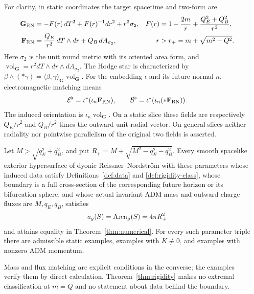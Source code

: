 For clarity, in static coordinates the target spacetime and two-form are
\begin{align}
 \mathbf G_{\rm RN}&=-F(r)\,dT^2+F(r)^{-1}dr^2+r^2\sigma_2,
 &F(r)&=1-\frac{2m}{r}+\frac{Q_E^2+Q_B^2}{r^2},
 \label{eq:rn-metric}\\
 \mathbf F_{\rm RN}&=\frac{Q_E}{r^2}\,dT\wedge dr
             +Q_B\,dA_{\sigma_2},
 &r&>r_+=m+\sqrt{m^2-Q^2}.
 \label{eq:rn-field}
\end{align}
Here $\sigma_2$ is the unit round metric with its oriented area form,
and $\operatorname{vol}_{\mathbf G}=r^2dT\wedge dr\wedge dA_{\sigma_2}$.
The Hodge star is characterized by
$\beta\wedge(*\gamma)=\langle\beta,\gamma\rangle_{\mathbf G}
\operatorname{vol}_{\mathbf G}$.
For the embedding $\iota$ and its future normal $n$, electromagnetic
matching means
\begin{equation}\label{eq:em-matching}
 \mathcal E^\flat=\iota^*(\iota_n\mathbf F_{\rm RN}),\qquad
 \mathcal B^\flat=\iota^*(\iota_n(*\mathbf F_{\rm RN})).
\end{equation}
The induced orientation is $\iota_n\operatorname{vol}_{\mathbf G}$.
On a static slice these fields are respectively $Q_E/r^2$ and $Q_B/r^2$
times the outward unit radial vector. On general slices neither radiality
nor pointwise parallelism of the original two fields is asserted.

\begin{theorem}\label{thm:converse}
Let $M>\sqrt{q_E^2+q_B^2}$, and put
$R_+=M+\sqrt{M^2-q_E^2-q_B^2}$. Every smooth spacelike exterior
hypersurface of dyonic Reissner--Nordstr\"om with these parameters whose
induced data satisfy Definitions~\ref{def:data} and
\ref{def:rigidity-class}, whose boundary is a full cross-section of the
corresponding future horizon or its bifurcation sphere, and whose actual
invariant ADM mass and outward charge fluxes are $M,q_E,q_B$, satisfies
\[
 a_g(S)=\operatorname{Area}_g(S)=4\pi R_+^2
\]
and attains equality in Theorem~\ref{thm:numerical}. For every such
parameter triple there are admissible static examples, examples with
$K\not\equiv0$, and examples with nonzero ADM momentum.
\end{theorem}

Mass and flux matching are explicit conditions in the converse;
the examples verify them by direct calculation. Theorem~\ref{thm:rigidity}
makes no extremal classification at $m=Q$ and no statement about data
behind the boundary.
